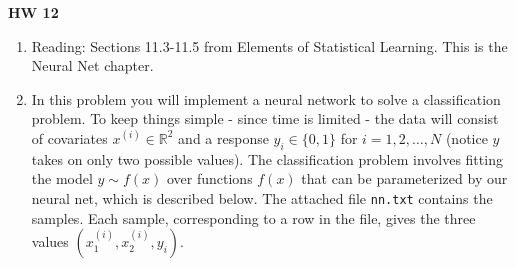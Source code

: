 \documentclass{article}
\begin{document}
\renewcommand{\a}{\textbf{a}}
\renewcommand{\b}{\textbf{b}}
\renewcommand{\d}{\textbf{d}}
\newcommand{\e}{\textbf{e}}

\large

\begin{center}
\textbf{HW 12} 
\end{center}
 


\medskip


\begin{enumerate} 

\item Reading:  Sections 11.3-11.5 from Elements of Statistical Learning.  This is the Neural Net chapter. 

\item In this problem you will implement a neural network to solve a classification problem.   To keep things simple - since time is limited - the data will consist of covariates $x^{(i)} \in \mathbb{R}^2$ and a response $y_i \in \{0,1\}$ for $i=1,2,\dots,N$ (notice $y$ takes on only two possible values).  The classification problem involves fitting the model $y \sim f(x)$ over functions $f(x)$ that can be parameterized by our neural net, which is described below.   The attached file \verb+nn.txt+ contains the samples.  Each sample, corresponding to a row in the file, gives the three values $(x^{(i)}_1, x^{(i)}_2, y_i)$.  

\vspace{.5cm}


\end{enumerate}
\end{document}
